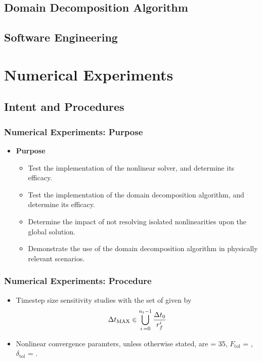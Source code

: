 \documentclass[compress,xcolor=table]{beamer}
\begin{document}
\subsection{Domain Decomposition Algorithm}

\subsection{Software Engineering}

\section[Numerical Experiments]{Numerical Experiments}
\subsection[Procedures]{Intent and Procedures}
\begin{frame}
\frametitle{Numerical Experiments: Purpose}
\begin{itemize}
\item{\textbf{Purpose}
\begin{itemize}
\item{Test the implementation of the nonlinear solver, and determine its efficacy.}
\item{Test the implementation of the domain decomposition algorithm, and determine its efficacy.}
\item{Determine the impact of not resolving isolated nonlinearities upon the global solution.}
\item{Demonstrate the use of the domain decomposition algorithm in physically relevant scenarios.}
\end{itemize}
}
\end{itemize}
\end{frame}
\begin{frame}
\frametitle{Numerical Experiments: Procedure}

\begin{itemize}
\item{Timestep size sensitivity studies with the set of \dtmax{} given by
\begin{equation*}
\dtmax{} \in \bigcup^{n_{t}-1}_{i\, = 0} \frac{\dt{}_{0}}{r^{i}_{f}}
\end{equation*}
}
\item{Nonlinear convergence paramters, unless otherwise stated, are \kmax{} = 35, $F_{\text{tol}}$ = , $\delta_{\text{tol}}$ = .}
\end{itemize}

\end{frame}
\end{document}

